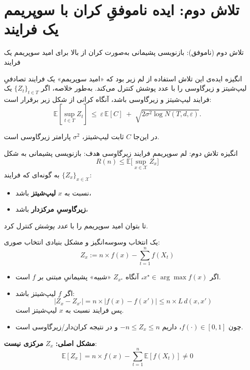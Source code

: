 \documentclass[aspectratio=169]{beamer}
\newcommand{\E}{\mathbb{E}}
\newcommand{\cX}{\mathcal{X}}
\newcommand{\eps}{\varepsilon}
\begin{document}
\section{تلاش دوم: ایده ناموفقِ کران با سوپریمم یک فرایند}
\begin{frame}{تلاش دوم (ناموفق): بازنویسی پشیمانی به‌صورت کران از بالا برای امید سوپریمم یک فرایند}

\begin{block}{انگیزه}
ایده‌ی این تلاش استفاده از لم زیر بود که «امید سوپریمم» یک فرایند تصادفیِ لیپ‌شیتز و زیرگاوسی را
با عدد پوشش کنترل می‌کند. به‌طور خلاصه، اگر $\{Z_t\}_{t\in T}$ یک فرایند لیپ‌شیتز و زیرگاوسی باشد، آنگاه کرانی از شکل زیر برقرار است:
\[
\E\!\left[\sup_{t\in T} Z_t\right]
\ \le\ 
\eps\,\E[C]
\;+\;
\sqrt{2\sigma^2\log N(T,d,\eps)}.
\]
\end{block}

\smallskip
در این‌جا $C$ ثابت لیپ‌شیتز، $\sigma^2$ پارامتر زیرگاوسی است.
\end{frame}

\begin{frame}{انگیزه تلاش دوم: لم سوپریمم فرایند زیرگاوسی}
هدف: بازنویسی پشیمانی به شکل
\[
R(n)\le \E\Big[\sup_{x\in\cX} Z_x\Big]
\]
به گونه‌ای که فرایند $\{Z_x\}_{x\in\cX}$:
\begin{itemize}
  \item نسبت به $x$ \textbf{لیپ‌شیتز} باشد،
  \item \textbf{زیرگاوسیِ مرکزدار} باشد،
\end{itemize}
تا بتوان امید سوپریمم را با \emph{عدد پوشش} کنترل کرد.
\end{frame}

\begin{frame}{یک انتخاب وسوسه‌انگیز و مشکل بنیادی}
انتخاب صوری:
\[
Z_x := n \times f(x) - \sum_{t=1}^n f(X_t)
\]
\begin{itemize}
  \item اگر $x^\star\in\arg\max f(x)$، آنگاه $Z_{x^\star}$ «شبیه» پشیمانیِ مبتنی بر $f$ است.
  \item اگر $f$ لیپ‌شیتز باشد:
  \[
  |Z_x-Z_{x'}|=n \times |f(x)-f(x')|\le n \times L\,d(x,x')
  \]
  پس فرایند نسبت به $x$ لیپ‌شیتز است.
  \item چون $f(\cdot)\in[0,1]$، داریم $-n\le Z_x\le n$ و در نتیجه کران‌دار/زیرگاوسی است.
\end{itemize}

\textbf{مشکل اصلی:} $Z_x$ \textbf{مرکزی نیست}:
\[
\E[Z_x]=n \times f(x)-\sum_{t=1}^n \E[f(X_t)]\neq 0
\]
\end{frame}
\end{document}
